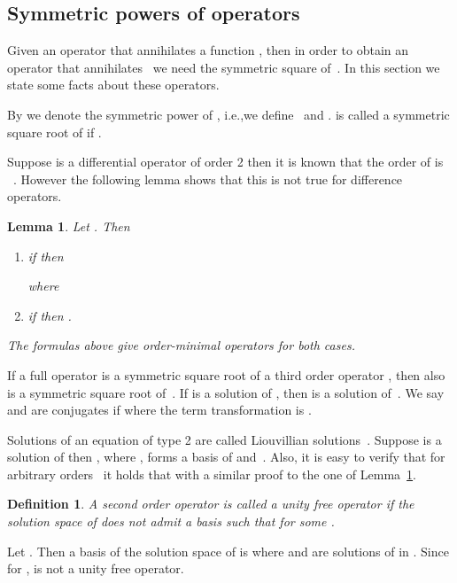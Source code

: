 \documentclass{article}
\newtheorem{lemma}[theorem]{Lemma}
\newtheorem{definition}[theorem]{Definition}
\begin{document}
\subsection{Symmetric powers of operators}
Given an operator  that annihilates a function , then in order to obtain an
operator  that annihilates~ we need the symmetric square of~. In this
section we state some facts about these operators.

By  we denote the  symmetric power of , i.e.,we
define~ and .   is
called a symmetric square root of  if .

Suppose  is a differential operator of order 2 then it is known that the order of
 is ~\cite[Lemma 3.2, (b)]{MS85}.  However the following lemma
shows that this is not true for difference operators.

\begin{lemma}\cite[Lemma 3]{GH10}\label{lemma:sym-power2}
 Let . Then
\begin{enumerate}
 \item 
	if  then 
	 
        where
        
\item if  then .
\end{enumerate}
The formulas above give order-minimal operators for both cases.
\end{lemma}




If a full operator  is
a symmetric square root of a third order operator , then also  is a symmetric square root of~. If  is a solution
of , then  is a solution of~. We say  and  are conjugates if  where the term transformation is .



Solutions of an equation of type 2 are called Liouvillian solutions~\cite{CH09,HS99,GH10}.
Suppose  is a solution of  then , where , forms a basis of  and~.  Also, it is easy to verify that
for arbitrary orders~ it holds that 
with a similar proof to the one of Lemma~\ref{lemma:sym-power2}.






\begin{definition}
  A second order operator  is called a unity free operator if the solution space of
   does not admit a basis  such that  for some .
\end{definition}


Let .  Then a basis of the solution space of  is 
where  and  are solutions of  in .  Since  for ,  is not a unity free operator.
\end{document}
